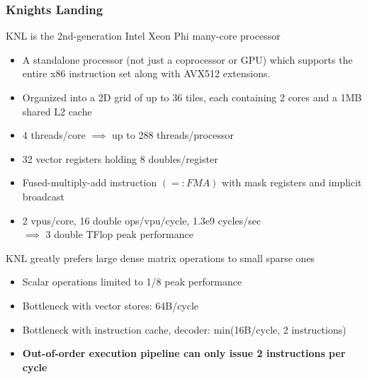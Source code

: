 \documentclass[9pt]{beamer}
\begin{document}
\begin{frame}
  \frametitle{Knights Landing}
  \begin{block}{KNL is the 2nd-generation Intel Xeon Phi many-core processor}
    \begin{itemize}
    \item A standalone processor (not just a coprocessor or GPU) which supports the entire x86 instruction set along with AVX512 extensions.
    \item Organized into a 2D grid of up to 36 tiles, each containing 2 cores and a 1MB shared L2 cache
    \item 4 threads/core $\implies$ up to 288 threads/processor
    \item 32 vector registers holding 8 doubles/register
    \item Fused-multiply-add instruction $(=:FMA)$ with mask registers and implicit broadcast
    \item 2 vpus/core, 16 double ops/vpu/cycle, 1.3e9 cycles/sec \\ $\implies$ 3 double TFlop peak performance

    \end{itemize}
  \end{block}
  \begin{block}{KNL greatly prefers large dense matrix operations to small sparse ones}
    \begin{itemize}
    \item Scalar operations limited to 1/8 peak performance
    \item Bottleneck with vector stores: 64B/cycle
    \item Bottleneck with instruction cache, decoder: min(16B/cycle, 2 instructions)
    \item \textbf{Out-of-order execution pipeline can only issue 2 instructions per cycle}
    \end{itemize}
  \end{block}
\end{frame}
\end{document}
